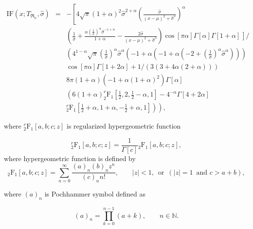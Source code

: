 \begin{eqnarray}
\mathrm{IF}(x;T_{\mathfrak{R}_\alpha},\hat{\sigma}) &=& -\left[4 \sqrt{\pi } (1+\alpha )^2 \hat{\sigma} ^{2+\alpha } \left(\frac{\hat{\sigma} }{(x-\mu )^2+\hat{\sigma} ^2}\right)^{\alpha} \right. \nonumber\\
&&\left(\frac{1}{\hat{\sigma} }+\frac{\alpha  \left(\frac{1}{\hat{\sigma} }\right)^{\alpha } \hat{\sigma} ^{-1+\alpha }}{1+\alpha }-\frac{2 \hat{\sigma} }{(x-\mu )^2+\hat{\sigma} ^2}\right) \left. \cos[\pi  \alpha ] \Gamma[\alpha ] \Gamma[1+\alpha ]  \frac{}{} \right] / \nonumber \\ %
&&\left(4^{1-\alpha } \sqrt{\pi } \left(\frac{1}{\hat{\sigma} }\right)^{\alpha } \hat{\sigma} ^{\alpha } \left(-1+\alpha  \left(-1+\alpha  \left(-2+\left(\frac{1}{\hat{\sigma} }\right)^{\alpha } \hat{\sigma} ^{\alpha }\right)\right)\right) \right.\nonumber \\ 
&&\left. \cos[\pi  \alpha ] \Gamma[1+2 \alpha ]+1/(3 (3+4 \alpha  (2+\alpha )))\right. \nonumber \\
&& 8 \pi  (1+\alpha ) \left(-1+\alpha  (1+\alpha )^2\right) \Gamma[\alpha ] \nonumber \\
&& \left(6 (1+\alpha ) ^r_2\mathrm{F}_1\left[\frac{1}{2},2,\frac{1}{2}-\alpha ,1\right]-4^{-\alpha } \Gamma[4+2 \alpha ] \right. \nonumber \\
&& \left. \left. ^r_2\mathrm{F}_1\left[\frac{1}{2}+\alpha ,1+\alpha ,-\frac{1}{2}+\alpha ,1\right]\right)\right),
\end{eqnarray}

\noindent where $^r_2\mathrm{F}_1[a,b;c;z]$ is regularized hypergeometric function

\begin{equation}
	^r_2\mathrm{F}_1[a,b;c;z] = {\frac{1}{\Gamma[c]}} {_2\mathrm{F}_1}[a,b;c;z],
\end{equation}
where hypergeometric function is defined by
\begin{equation}
	{_2\mathrm{F}_1}[a,b;c;z]=\sum _{n=0}^{\infty } \frac{(a)_n (b)_n z^n}{ (c)_n n!}, \qquad |z|<1, \, \text{ or } \, (|z|=1  \, \text{ and} \,\,  c>a+b),
\end{equation}

\noindent where $(a)_n$ is Pochhammer symbol defined as

\begin{equation}
(a)_n=\prod _{k=0}^{n-1} (a+k), \qquad n \in \mathbb{N}.
\end{equation}

